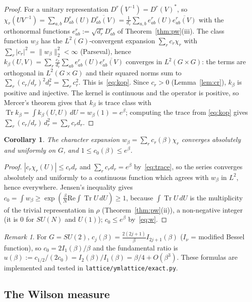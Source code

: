 \documentclass[11pt,a4paper]{article}
\newtheorem{corollary}[theorem]{Corollary}
\theoremstyle{definition}
\theoremstyle{remark}
\newtheorem{remark}[theorem]{Remark}
\DeclareMathOperator{\Tr}{Tr}
\newcommand{\dU}{\,dU}
\newcommand{\norm}[1]{\lVert #1\rVert}
\begin{document}
\begin{proof}
For a unitary representation $D^r(V^{-1})=D^r(V)^*$, so
$\chi_r(UV^{-1})=\sum_{a,b}D^r_{ab}(U)\overline{D^r_{ab}(V)}=\frac1{d_r}\sum_{a,b}e^r_{ab}(U)\overline{e^r_{ab}(V)}$
with the orthonormal functions $e^r_{ab}:=\sqrt{d_r}D^r_{ab}$ of Theorem~\ref{thm:pw}(iii). The class function
$w_\beta$ has the $L^2(G)$-convergent expansion $\sum_rc_r\chi_r$ with $\sum_r|c_r|^2=\norm{w_\beta}_2^2<\infty$
(Parseval), hence $k_\beta(U,V)=\sum_r\frac{c_r}{d_r}\sum_{ab}e^r_{ab}(U)\overline{e^r_{ab}(V)}$ converges in
$L^2(G\times G)$: the terms are orthogonal in $L^2(G\times G)$ and their squared norms sum to
$\sum_r(c_r/d_r)^2d_r^2=\sum_rc_r^2$. This is~\eqref{eq:kop}. Since $c_r>0$ (Lemma~\ref{lem:cr}), $k_\beta$
is positive and injective. The kernel is continuous and the operator is positive, so Mercer's theorem gives
that $k_\beta$ is trace class with $\Tr k_\beta=\int k_\beta(U,U)\dU=w_\beta(1)=e^\beta$; computing the trace from
\eqref{eq:kop} gives $\sum_r(c_r/d_r)\,d_r^2=\sum_rc_rd_r$.
\end{proof}

\begin{corollary}\label{cor:uniform}
The character expansion $w_\beta=\sum_rc_r(\beta)\chi_r$ converges absolutely and uniformly on $G$, and
$1\le c_0(\beta)\le e^\beta$.
\end{corollary}

\begin{proof}
$|c_r\chi_r(U)|\le c_rd_r$ and $\sum_rc_rd_r=e^\beta$ by~\eqref{eq:trace}, so the series converges absolutely
and uniformly to a continuous function which agrees with $w_\beta$ in $L^2$, hence everywhere. Jensen's inequality
gives $c_0=\int w_\beta\ge\exp(\frac\beta N\mathrm{Re}\int\Tr U\dU)\ge1$, because $\int\Tr U\dU$ is the multiplicity of the
trivial representation in $\rho$ (Theorem~\ref{thm:pw}(ii)), a non-negative integer (it is $0$ for $SU(N)$ and $U(1)$);
$c_0\le e^\beta$ by~\eqref{eq:w}.
\end{proof}

\begin{remark}
For $G=SU(2)$, $c_j(\beta)=\frac{2(2j+1)}{\beta}I_{2j+1}(\beta)$ ($I_\nu$ = modified Bessel function), so
$c_0=2I_1(\beta)/\beta$ and the fundamental ratio is $u(\beta):=c_{1/2}/(2c_0)=I_2(\beta)/I_1(\beta)=\beta/4+O(\beta^3)$.
These formulas are implemented and tested in \texttt{lattice/ymlattice/exact.py}.
\end{remark}

\subsection{The Wilson measure}
\end{document}
